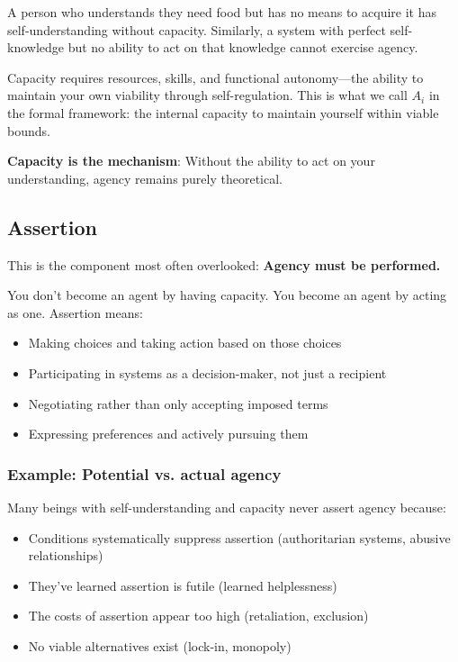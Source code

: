 \documentclass[12pt,a4paper]{article}
\begin{document}
A person who understands they need food but has no means to acquire it has self-understanding without capacity. Similarly, a system with perfect self-knowledge but no ability to act on that knowledge cannot exercise agency.

Capacity requires resources, skills, and functional autonomy—the ability to maintain your own viability through self-regulation. This is what we call $A_i$ in the formal framework: the internal capacity to maintain yourself within viable bounds.

\textbf{Capacity is the mechanism}: Without the ability to act on your understanding, agency remains purely theoretical.

\subsection{Assertion}

This is the component most often overlooked: \textbf{Agency must be performed.}

You don't become an agent by having capacity. You become an agent by acting as one. Assertion means:

\begin{itemize}
    \item Making choices and taking action based on those choices
    \item Participating in systems as a decision-maker, not just a recipient
    \item Negotiating rather than only accepting imposed terms
    \item Expressing preferences and actively pursuing them
\end{itemize}

\subsubsection*{Example: Potential vs. actual agency}

Many beings with self-understanding and capacity never assert agency because:

\begin{itemize}
    \item Conditions systematically suppress assertion (authoritarian systems, abusive relationships)
    \item They've learned assertion is futile (learned helplessness)
    \item The costs of assertion appear too high (retaliation, exclusion)
    \item No viable alternatives exist (lock-in, monopoly)
\end{itemize}
\end{document}

